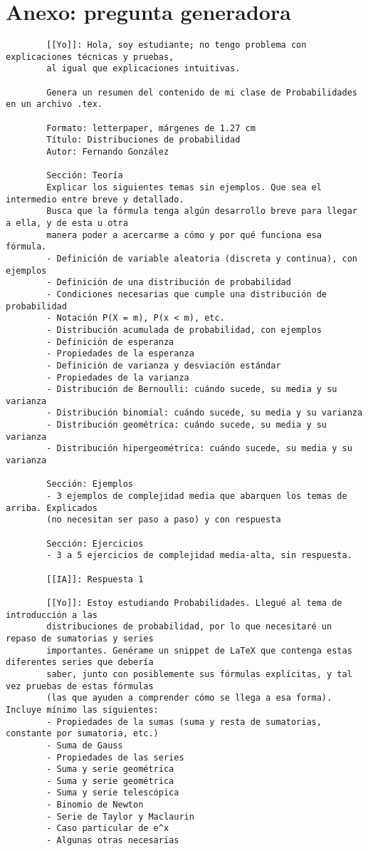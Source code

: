 \documentclass[letterpaper, 12pt]{article}
\begin{document}
	\section*{Anexo: pregunta generadora}
	\begin{verbatim}
		[[Yo]]: Hola, soy estudiante; no tengo problema con explicaciones técnicas y pruebas,
		al igual que explicaciones intuitivas.
		
		Genera un resumen del contenido de mi clase de Probabilidades en un archivo .tex.
		
		Formato: letterpaper, márgenes de 1.27 cm
		Título: Distribuciones de probabilidad
		Autor: Fernando González
		
		Sección: Teoría
		Explicar los siguientes temas sin ejemplos. Que sea el intermedio entre breve y detallado.
		Busca que la fórmula tenga algún desarrollo breve para llegar a ella, y de esta u otra
		manera poder a acercarme a cómo y por qué funciona esa fórmula.
		- Definición de variable aleatoria (discreta y continua), con ejemplos
		- Definición de una distribución de probabilidad
		- Condiciones necesarias que cumple una distribución de probabilidad
		- Notación P(X = m), P(x < m), etc.
		- Distribución acumulada de probabilidad, con ejemplos
		- Definición de esperanza
		- Propiedades de la esperanza
		- Definición de varianza y desviación estándar
		- Propiedades de la varianza
		- Distribución de Bernoulli: cuándo sucede, su media y su varianza
		- Distribución binomial: cuándo sucede, su media y su varianza
		- Distribución geométrica: cuándo sucede, su media y su varianza
		- Distribución hipergeométrica: cuándo sucede, su media y su varianza
		
		Sección: Ejemplos
		- 3 ejemplos de complejidad media que abarquen los temas de arriba. Explicados
		(no necesitan ser paso a paso) y con respuesta
		
		Sección: Ejercicios
		- 3 a 5 ejercicios de complejidad media-alta, sin respuesta.
		
		[[IA]]: Respuesta 1
		
		[[Yo]]: Estoy estudiando Probabilidades. Llegué al tema de introducción a las
		distribuciones de probabilidad, por lo que necesitaré un repaso de sumatorias y series
		importantes. Genérame un snippet de LaTeX que contenga estas diferentes series que debería
		saber, junto con posiblemente sus fórmulas explícitas, y tal vez pruebas de estas fórmulas
		(las que ayuden a comprender cómo se llega a esa forma). Incluye mínimo las siguientes:
		- Propiedades de la sumas (suma y resta de sumatorias, constante por sumatoria, etc.)
		- Suma de Gauss
		- Propiedades de las series
		- Suma y serie geométrica
		- Suma y serie geométrica
		- Suma y serie telescópica
		- Binomio de Newton
		- Serie de Taylor y Maclaurin
		- Caso particular de e^x
		- Algunas otras necesarias
		

\end{verbatim}
\end{document}
